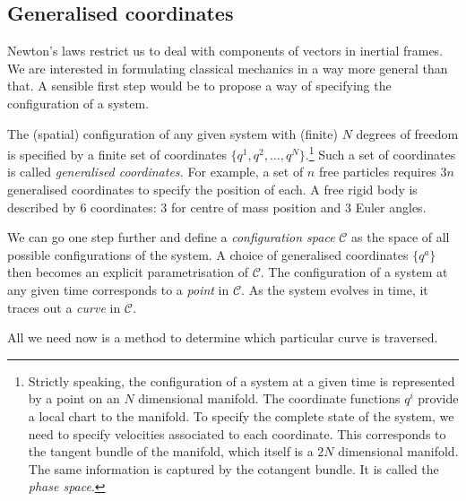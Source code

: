\documentclass{article}
\begin{document}
\subsection{Generalised coordinates}
Newton's laws restrict us to deal with components of vectors in inertial frames. We are interested in formulating classical mechanics in a way more general than that. A sensible first step would be to propose a way of specifying the configuration of a system.
\par
The (spatial) configuration of any given system with (finite) $N$ degrees of freedom is specified by a finite set of coordinates $\{q^1, q^2, \dots, q^N \}$.\footnote{Strictly speaking, the configuration of a system at a given time is represented by a point on an $ N $ dimensional manifold. The coordinate functions $ q^{i} $ provide a local chart to the manifold. To specify the complete state of the system, we need to specify velocities associated to each coordinate. This corresponds to the tangent bundle of the manifold,  which itself is a $ 2N $ dimensional manifold. The same information is captured by the cotangent bundle. It is called the \textit{phase space}.} Such a set of coordinates is called \textit{generalised coordinates.} For example, a set of $n$ free particles requires $3n$ generalised coordinates to specify the position of each. A free rigid body is described by $6$ coordinates: 3 for centre of mass position and 3 Euler angles. 
\par
We can go one step further and define a \textit{configuration space} $\mathcal{C}$ as the space of all possible configurations of the system. A choice of generalised coordinates $\{q^a\}$ then becomes an explicit parametrisation of $\mathcal{C}$. The configuration of a system at any given time corresponds to a \textit{point} in $\mathcal{C}$. As the system evolves in time, it traces out a \textit{curve} in $\mathcal{C}$.
\par
All we need now is a method to determine which particular curve is traversed.
\end{document}
